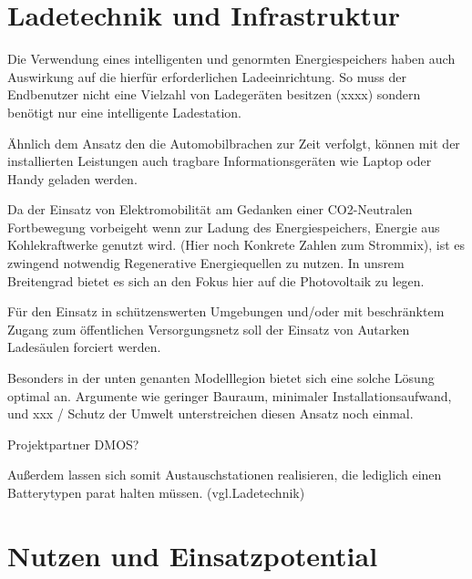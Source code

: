 \section{Ladetechnik und Infrastruktur}

Die Verwendung eines intelligenten und genormten Energiespeichers haben auch Auswirkung auf die hierfür erforderlichen Ladeeinrichtung. So muss der Endbenutzer nicht eine Vielzahl von Ladegeräten besitzen (xxxx) sondern benötigt nur eine intelligente Ladestation. %

Ähnlich dem Ansatz den die Automobilbrachen zur Zeit verfolgt, können mit der installierten Leistungen auch tragbare Informationsgeräten wie Laptop oder Handy geladen werden. 

Da der Einsatz von Elektromobilität am Gedanken einer CO2-Neutralen Fortbewegung vorbeigeht wenn zur Ladung des Energiespeichers, Energie aus Kohlekraftwerke genutzt wird. (Hier noch Konkrete Zahlen zum Strommix), ist es zwingend notwendig Regenerative Energiequellen zu nutzen. In unsrem Breitengrad bietet es sich an den Fokus hier auf die Photovoltaik zu legen.

Für den Einsatz in  schützenswerten Umgebungen und/oder mit beschränktem Zugang zum öffentlichen Versorgungsnetz soll der Einsatz von Autarken Ladesäulen forciert werden.

Besonders in der unten genanten Modelllegion bietet sich eine solche Lösung optimal an. 
Argumente wie geringer Bauraum, minimaler Installationsaufwand, und xxx  / Schutz der Umwelt unterstreichen diesen Ansatz noch einmal.

Projektpartner DMOS?

Außerdem lassen sich somit Austauschstationen realisieren, die lediglich einen Batterytypen parat halten müssen. (vgl.Ladetechnik)

\section{Nutzen und Einsatzpotential}

